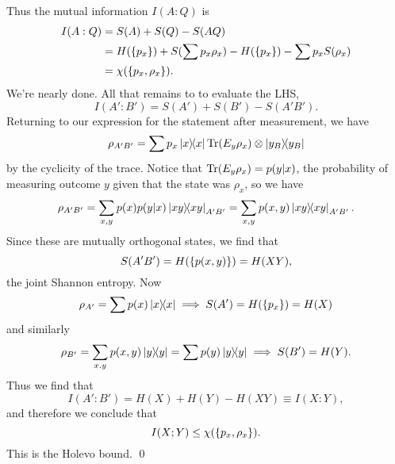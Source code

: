 Thus the mutual information $I(A:Q)$ is
\begin{align*}
    I(A:Q) &= S(A) + S(Q) -S(AQ)\\
    &= H(\{p_x\}) + S(\sum p_x \rho_x) - H(\{p_x\}) -\sum p_x S(\rho_x)\\
    &= \chi(\{p_x,\rho_x\}).
\end{align*}
We're nearly done. All that remains to to evaluate the LHS,
\begin{equation}
    I(A':B')=S(A')+S(B')-S(A'B').
\end{equation}
Returning to our expression for the statement after measurement, we have
\begin{equation}
    \rho_{A'B'}=\sum p_x \left\lvert{x}\middle\rangle\!\middle\langle{x}\right\rvert \operatorname{Tr}(E_y \rho_x) \otimes \left\lvert{y_B}\middle\rangle\!\middle\langle{y_B}\right\rvert
\end{equation}
by the cyclicity of the trace. Notice that $\operatorname{Tr}(E_y \rho_x) = p(y|x)$, the probability of measuring outcome $y$ given that the state was $\rho_x$, so we have
\begin{equation}
    \rho_{A'B'}= \sum_{x,y} p(x) p(y|x) \left\lvert{xy}\middle\rangle\!\middle\langle{xy}\right\rvert_{A'B'} = \sum_{x,y} p(x,y) \left\lvert{xy}\middle\rangle\!\middle\langle{xy}\right\rvert_{A'B'}.
\end{equation}
Since these are mutually orthogonal states, we find that
\begin{equation}
    S(A'B')=H(\{p(x,y)\}) = H(XY),
\end{equation}
the joint Shannon entropy. Now
\begin{equation}
    \rho_{A'}=\sum p(x) \left\lvert{x}\middle\rangle\!\middle\langle{x}\right\rvert \implies S(A')= H(\{p_x\})=H(X)
\end{equation}
and similarly
\begin{equation}
    \rho_{B'}=\sum_{x.y} p(x,y)\left\lvert{y}\middle\rangle\!\middle\langle{y}\right\rvert = \sum p(y) \left\lvert{y}\middle\rangle\!\middle\langle{y}\right\rvert \implies S(B')=H(Y).
\end{equation}
Thus we find that
\begin{equation}
    I(A':B')=H(X)+H(Y)-H(XY)\equiv I(X:Y),
\end{equation}
and therefore we conclude that
\begin{equation}
    I(X;Y) \leq \chi(\{p_x,\rho_x\}). 
\end{equation}
This is the Holevo bound. \qed

